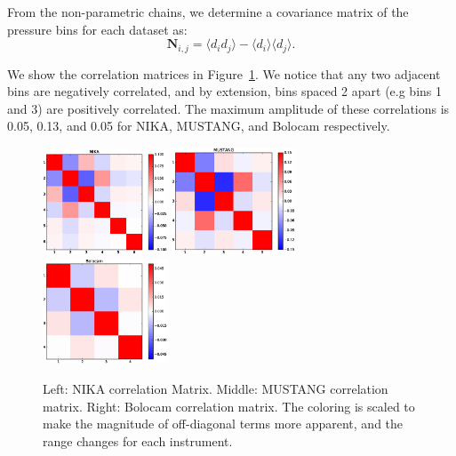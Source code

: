 \documentclass[twocolumn,traditabstract]{aa}
\begin{document}
From the non-parametric chains, we determine a covariance matrix of the pressure bins for each dataset as:
\begin{equation}
  \mathbf{N}_{i,j} = \langle d_i d_j \rangle - \langle d_i \rangle \langle d_j \rangle.
  \label{eqn:covariance}
\end{equation}

We show the correlation matrices in Figure~\ref{fig:corr_matrices}. We notice
    that any two adjacent bins are negatively correlated, and by extension, bins spaced 2 apart (e.g bins 1 and 3) are positively
    correlated. The maximum amplitude of these correlations is 0.05, 0.13, and 0.05 for NIKA, MUSTANG, and Bolocam respectively.

\begin{figure}[h]
  \centering
  \includegraphics[width=0.33\textwidth]{NIKA_ml_deproj_figs/Real_Joint_gNFW_Real_11011111_2500S_500B_100W_NIKA_correlation_matrix_clim_bwr.eps}
  \includegraphics[width=0.33\textwidth]{NIKA_ml_deproj_figs/Real_Joint_gNFW_Real_11011111_2500S_500B_100W_MUSTANG_correlation_matrix_clim_bwr.eps}
  \includegraphics[width=0.33\textwidth]{NIKA_ml_deproj_figs/Real_Joint_gNFW_Real_11011111_2500S_500B_100W_Bolocam_correlation_matrix_clim_bwr.eps}
  \caption{Left: NIKA correlation Matrix. Middle: MUSTANG correlation matrix. Right: Bolocam correlation matrix. The coloring is
    scaled to make the magnitude of off-diagonal terms more apparent, and the range changes for each instrument.}
  \label{fig:corr_matrices}
\end{figure}
\end{document}
